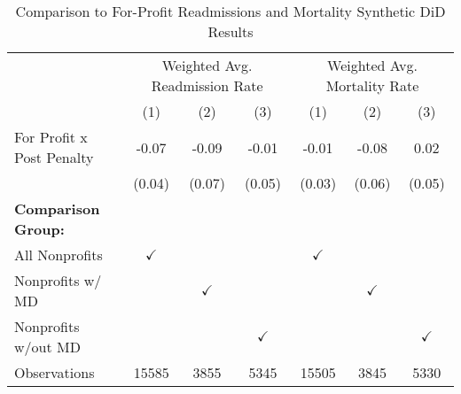 \begin{table}[ht!]

\caption{\label{tab:forprofit_synth} Comparison to For-Profit Readmissions and Mortality Synthetic DiD Results}
\centering
\begin{tabular}[t]{lcccccc}
\toprule
\multicolumn{1}{c}{ } & \multicolumn{3}{c}{Weighted Avg. Readmission Rate} & \multicolumn{3}{c}{Weighted Avg. Mortality Rate} \\
\cmidrule(l{3pt}r{3pt}){2-4} \cmidrule(l{3pt}r{3pt}){5-7}
 & (1) & (2) & (3) & (1) & (2) & (3)\\
\midrule
For Profit x Post Penalty & -0.07 & -0.09 & -0.01 & -0.01 & -0.08 & 0.02\\
 & (0.04) & (0.07) & (0.05) & (0.03) & (0.06) & (0.05)\\
\textbf{Comparison Group:} &  &  &  &  &  & \\
All Nonprofits & $\checkmark$ &  &  & $\checkmark$ &  & \\
Nonprofits w/ MD &  & $\checkmark$ &  &  & $\checkmark$ & \\
\addlinespace
Nonprofits w/out MD &  &  & $\checkmark$ &  &  & $\checkmark$\\
Observations & 15585 & 3855 & 5345 & 15505 & 3845 & 5330\\
\bottomrule
\end{tabular}
\end{table}
